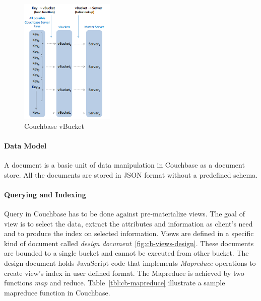 \begin{figure}[h]
	\centering
	\includegraphics[width=0.4\textwidth]{img/vbucket2}
	\caption{ Couchbase  vBucket ~\cite{couchbasedocs}}
	\label{fig:cb-vbucket}
\end{figure}

\paragraph{Data Model}%
A document is a basic unit of data manipulation in Couchbase  as a document store. All the documents are stored in JSON format without a predefined schema.

\paragraph{Querying and Indexing}
Query in Couchbase has to be done against pre-materialize views. The goal of view is to select the data, extract the attributes and information as client's need  and to produce the index on selected information. Views are defined in a specific kind of document called \textit{design document}~\ref{fig:cb-views-design}. These documents are bounded to a single bucket and cannot be executed from other bucket. The design document holds JavaScript code that implements \textit{Mapreduce} operations to create view's index in user defined format. The Mapreduce is achieved by two functions \textit{map} and reduce. Table~\ref{tbl:cb-mapreduce} illustrate a sample mapreduce function in Couchbase.

